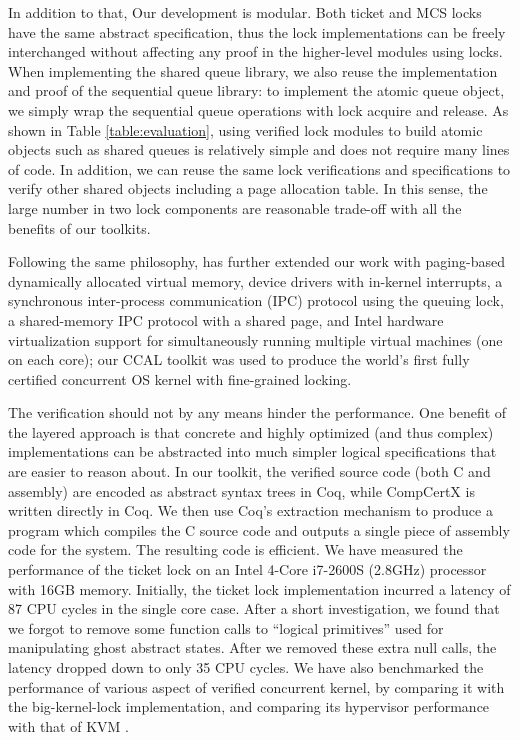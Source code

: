 {In addition to that, Our development is modular. 
Both ticket and MCS locks have the same
abstract specification,
thus the lock implementations can be freely interchanged without affecting any proof
in the higher-level modules using locks. When implementing the shared queue library, we
also reuse the implementation and proof of the sequential queue library:
to implement the atomic queue object, we simply wrap the
sequential queue operations with lock acquire and release.
As shown in Table \ref{table:evaluation}, using verified lock modules to build
atomic objects such as shared queues is relatively simple and does not require
many lines of code.
In addition, we can reuse the same lock verifications and specifications to verify other shared 
objects including a page allocation table.
In this sense, the large number in two lock components are reasonable trade-off
with all the benefits of our toolkits. 

Following the same philosophy, \citet{certikos-osdi16} has
further extended our work with paging-based dynamically allocated
virtual memory, device drivers with in-kernel interrupts, a
synchronous inter-process communication (IPC) protocol using the
queuing lock, a shared-memory IPC protocol with a shared page, and
Intel hardware virtualization support for simultaneously running
multiple virtual machines (one on each core); our CCAL toolkit was
used to produce the world's first fully certified concurrent OS kernel
with fine-grained locking.
 }

The verification should not by any means hinder the performance.
One benefit of the layered approach is that
concrete and highly optimized (and thus complex) implementations can be abstracted
into much simpler logical specifications that are easier to reason about.
In our toolkit, the verified source code (both C and assembly) are encoded as
abstract syntax trees in Coq, while CompCertX is written directly in
Coq. We then use Coq's extraction mechanism to produce a program which
compiles the C source code and outputs a single piece of assembly code
for the system. The resulting code is efficient.
We have measured the performance
of the ticket lock on an Intel 4-Core i7-2600S (2.8GHz) processor with 16GB memory.
Initially, the ticket lock implementation incurred a latency of 87 CPU cycles in the
single core case.
After a short investigation, we found that we forgot to remove some function calls
to ``logical primitives'' used for manipulating ghost abstract states. After we removed
these extra null calls, the latency dropped down to only 35 CPU cycles.
We have also benchmarked the performance of various aspect of verified concurrent kernel,
by comparing it with the big-kernel-lock implementation, and comparing its hypervisor
performance with that of KVM \cite{Gu:2016}.
